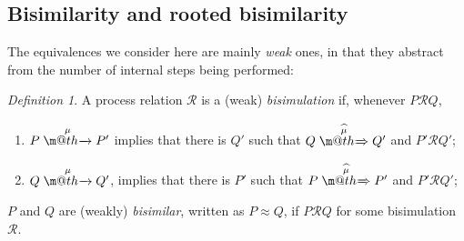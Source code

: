\documentclass[GCNS]{yincog}
\makeatletter
\def \rightarrowfill{$\m@th\mathord{\smash-}\mkern-6mu%
  \cleaders\hbox{$\mkern-2mu\mathord{\smash-}\mkern-2mu$}\hfill
  \mkern-6mu\mathord\rightarrow$}
\def \rightarrowfillWEAK{$\m@th\mathord{\smash=}\mkern-6mu%
  \cleaders\hbox{$\mkern-2mu\mathord{\smash=}\mkern-2mu$}\hfill
  \mkern-6mu\mathord\Rightarrow$}
\theoremstyle{remark}
\newtheorem{definition}{Definition}[section]
\theoremstyle{theorem}
\theoremstyle{remark}
\newcommand{\arr}[1]{\mathrel{\stackrel{{\;\;#1\;\;}}{\mbox{\rightarrowfill}}}}
\newcommand{\Arcap}[1]{\mathrel{\stackrel{{\;\;{\widehat{#1}}\;\;}}{\mbox{\rightarrowfillWEAK}}}}
\def\Rvtex{\mathcal{R}}
\def\RRvtex{\mathrel{\mathcal{R}}}
\newcommand{\wbvtex}{\approx}
\makeatother
\begin{document}
\subsection{Bisimilarity and rooted bisimilarity}
 \label{ss:BiEx}

The equivalences we consider here are mainly \emph{weak} ones, in that they
abstract from the number of internal steps being performed:
%
\begin{definition}%
 \label{d:wb}
A process relation ${\Rvtex}$ is a (weak) \emph{bisimulation} if, whenever
$P\RRvtex Q$,
%
\begin{enumerate}
%
\item $P \arr\mu P'$ implies that there is $Q'$ such that
$Q \Arcap \mu Q'$ and $P' \RRvtex Q'$;
%
\item $Q \arr\mu Q'$, implies that there is $P'$ such that
$P \Arcap \mu P'$ and $P' \RRvtex Q'$;
%
\end{enumerate}
%
$P$ and $Q$ are (weakly) \emph{bisimilar}, written as $P \wbvtex Q$, if
$P \RRvtex Q$ for some bisimulation $\Rvtex $.
\end{definition}
\end{document}
